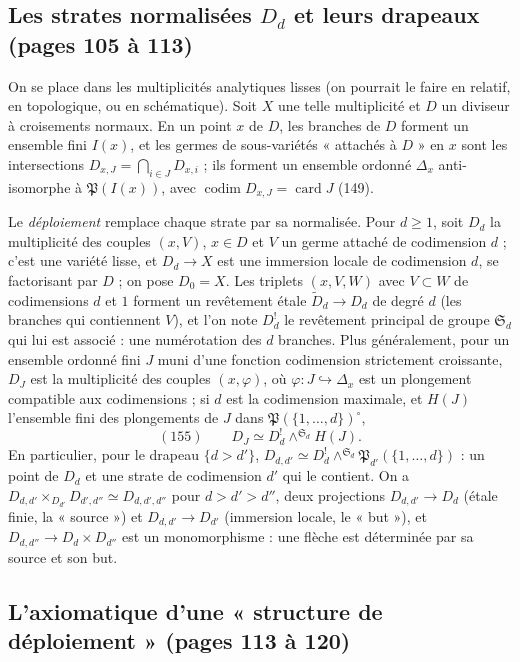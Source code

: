 \documentclass[11pt,a4paper]{article}
\begin{document}
\subsection*{Les strates normalisées $D_d$ et leurs drapeaux (pages 105 à 113)}

On se place dans les multiplicités analytiques lisses (on pourrait le faire en
relatif, en topologique, ou en schématique). Soit $X$ une telle multiplicité et
$D$ un diviseur à croisements normaux. En un point $x$ de $D$, les branches de
$D$ forment un ensemble fini $I(x)$, et les germes de sous-variétés « attachés à
$D$ » en $x$ sont les intersections $D_{x,J} = \bigcap_{i \in J} D_{x,i}$ ; ils
forment un ensemble ordonné $\Delta_x$ anti-isomorphe à $\mathfrak{P}(I(x))$, avec
$\operatorname{codim} D_{x,J} = \operatorname{card} J$ (149).

Le \emph{déploiement} remplace chaque strate par sa normalisée. Pour $d \geq 1$,
soit $D_d$ la multiplicité des couples $(x, V)$, $x \in D$ et $V$ un germe attaché
de codimension $d$ ; c'est une variété lisse, et $D_d \to X$ est une immersion
locale de codimension $d$, se factorisant par $D$ ; on pose $D_0 = X$. Les
triplets $(x, V, W)$ avec $V \subset W$ de codimensions $d$ et $1$ forment un
revêtement étale $\widetilde{D}_d \to D_d$ de degré $d$ (les branches qui
contiennent $V$), et l'on note $D^{!}_d$ le revêtement principal de groupe
$\mathfrak{S}_d$ qui lui est associé : une numérotation des $d$ branches. Plus
généralement, pour un ensemble ordonné fini $J$ muni d'une fonction codimension
strictement croissante, $D_J$ est la multiplicité des couples $(x, \varphi)$, où
$\varphi : J \hookrightarrow \Delta_x$ est un plongement compatible aux
codimensions ; si $d$ est la codimension maximale, et $H(J)$ l'ensemble fini des
plongements de $J$ dans $\mathfrak{P}(\{1, \dots, d\})^{\circ}$,
\[
(155) \qquad D_J \simeq D^{!}_d \wedge^{\mathfrak{S}_d} H(J) .
\]
En particulier, pour le drapeau $\{d > d'\}$, $D_{d,d'} \simeq D^{!}_d
\wedge^{\mathfrak{S}_d} \mathfrak{P}_{d'}(\{1, \dots, d\})$ : un point de $D_d$ et
une strate de codimension $d'$ qui le contient. On a $D_{d,d'} \times_{D_{d'}}
D_{d',d''} \simeq D_{d,d',d''}$ pour $d > d' > d''$, deux projections $D_{d,d'}
\to D_d$ (étale finie, la « source ») et $D_{d,d'} \to D_{d'}$ (immersion locale,
le « but »), et $D_{d,d''} \to D_d \times D_{d''}$ est un monomorphisme : une
flèche est déterminée par sa source et son but.

\subsection*{L'axiomatique d'une « structure de déploiement » (pages 113 à 120)}
\end{document}
